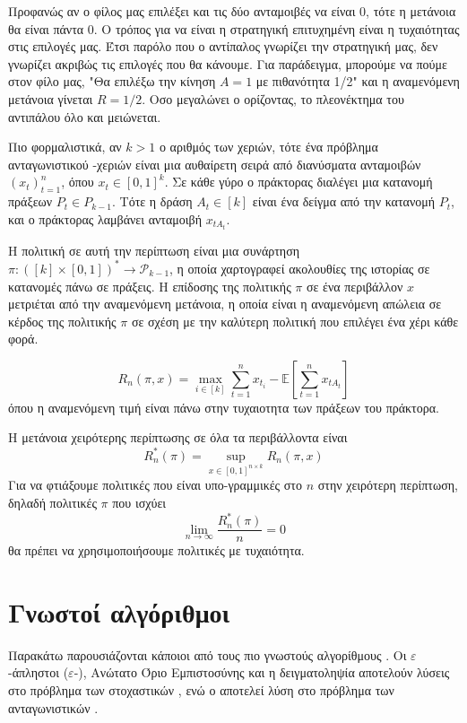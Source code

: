 Προφανώς αν ο φίλος μας επιλέξει και τις δύο ανταμοιβές να είναι 0, τότε η μετάνοια θα είναι πάντα 0. Ο τρόπος για να είναι η στρατηγική επιτυχημένη είναι η τυχαιότητας στις επιλογές μας. Έτσι παρόλο που ο αντίπαλος γνωρίζει την στρατηγική μας, δεν γνωρίζει ακριβώς τις επιλογές που θα κάνουμε. Για παράδειγμα, μπορούμε να πούμε στον φίλο μας, "Θα επιλέξω την κίνηση $A=1$ με πιθανότητα 1/2" και η αναμενόμενη μετάνοια γίνεται $R=1/2$.  Οσο μεγαλώνει ο ορίζοντας, το πλεονέκτημα του αντιπάλου όλο και μειώνεται.

Πιο φορμαλιστικά, αν $k>1$ ο αριθμός των χεριών, τότε ένα πρόβλημα ανταγωνιστικού  -χεριών είναι μια αυθαίρετη σειρά από διανύσματα ανταμοιβών $(x_t)_{t=1}^n$, όπου $x_t \in [0,1]^k$. Σε κάθε γύρο ο πράκτορας διαλέγει μια κατανομή πράξεων $P_t \in P_{k-1}$. Τότε η δράση $A_t \in [k]$ είναι ένα δείγμα από την κατανομή $P_t$, και ο πράκτορας λαμβάνει ανταμοιβή $x_{tA_t}$.

Η πολιτική σε αυτή την περίπτωση είναι μια συνάρτηση $π: ([k] \times [0,1])^* \rightarrow \mathcal{P}_{k-1}$, η οποία χαρτογραφεί ακολουθίες της ιστορίας σε κατανομές πάνω σε πράξεις.
Η επίδοσης της πολιτικής $π$ σε ένα περιβάλλον $x$ μετριέται από την αναμενόμενη μετάνοια, η οποία είναι η αναμενόμενη απώλεια σε κέρδος της πολιτικής $π$ σε σχέση με την καλύτερη πολιτική που επιλέγει ένα χέρι κάθε φορά.

\begin{equation}
    R_n(π,x) = \max_{i \in [k]} \sum_{t=1}^n x_{t_i} - \mathbb{E}\left[\sum_{t=1}^n x_{tA_t}\right]
\end{equation}
όπου η αναμενόμενη τιμή είναι πάνω στην τυχαιοτητα των πράξεων του πράκτορα.

Η μετάνοια χειρότερης περίπτωσης σε όλα τα περιβάλλοντα είναι
\begin{equation*}
    R_n^*(π) =  \sup_{x \in [0,1]^{n \times k}} R_n(π,x)
\end{equation*}
Για να φτιάξουμε πολιτικές που είναι υπο-γραμμικές στο $n$ στην χειρότερη περίπτωση, δηλαδή πολιτικές $π$ που ισχύει
\begin{equation*}
    \lim_{n \to \infty} \frac{R^*_n(π)}{n} = 0
\end{equation*}
θα πρέπει να χρησιμοποιήσουμε πολιτικές με τυχαιότητα.

\section{Γνωστοί αλγόριθμοι}

Παρακάτω παρουσιάζονται κάποιοι από τους πιο γνωστούς αλγορίθμους . Οι $ε$-άπληστοι ($ε$-), Ανώτατο Όριο Εμπιστοσύνης  και η δειγματοληψία  αποτελούν λύσεις στο πρόβλημα των στοχαστικών , ενώ ο  αποτελεί λύση στο πρόβλημα των ανταγωνιστικών .

